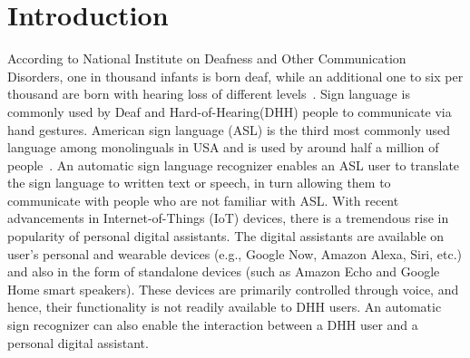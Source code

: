 \documentclass[10pt,twocolumn,letterpaper]{article}
\begin{document}
\section{Introduction}

According to National Institute on Deafness and Other Communication Disorders, one in thousand infants is born deaf, while an additional one to six per thousand are born with hearing loss of different levels~\cite{3072291}. Sign language is commonly used by Deaf and Hard-of-Hearing(DHH) people to communicate via hand gestures. American sign language (ASL) is the third most commonly used language among monolinguals in USA and is used by around half a million of people~\cite{sign_lang_study}. An automatic sign language recognizer enables an ASL user to translate the sign language to written text or speech, in turn allowing them to communicate with people who are not familiar with ASL. With recent advancements in Internet-of-Things (IoT) devices, there is a tremendous rise in popularity of personal digital assistants. The digital assistants are available on user's personal and wearable devices (e.g., Google Now, Amazon Alexa, Siri, etc.) and also in the form of standalone devices (such as Amazon Echo and Google Home smart speakers). These devices are primarily controlled through voice, and hence, their functionality is not readily available to DHH users. An automatic sign recognizer can also enable the interaction between a DHH user and a personal digital assistant. 

\end{document}
